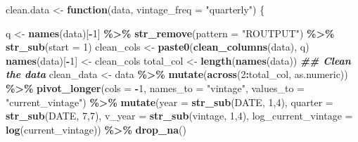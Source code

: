 \documentclass[
]{article}
\newenvironment{Shaded}{\begin{snugshade}}{\end{snugshade}}
\newcommand{\AttributeTok}[1]{\textcolor[rgb]{0.13,0.29,0.53}{#1}}
\newcommand{\ControlFlowTok}[1]{\textcolor[rgb]{0.13,0.29,0.53}{\textbf{#1}}}
\newcommand{\DecValTok}[1]{\textcolor[rgb]{0.00,0.00,0.81}{#1}}
\newcommand{\DocumentationTok}[1]{\textcolor[rgb]{0.56,0.35,0.01}{\textbf{\textit{#1}}}}
\newcommand{\FunctionTok}[1]{\textcolor[rgb]{0.13,0.29,0.53}{\textbf{#1}}}
\newcommand{\NormalTok}[1]{#1}
\newcommand{\OtherTok}[1]{\textcolor[rgb]{0.56,0.35,0.01}{#1}}
\newcommand{\SpecialCharTok}[1]{\textcolor[rgb]{0.81,0.36,0.00}{\textbf{#1}}}
\newcommand{\StringTok}[1]{\textcolor[rgb]{0.31,0.60,0.02}{#1}}
\begin{document}
\begin{Shaded}
\begin{Highlighting}[]
\NormalTok{clean.data }\OtherTok{\textless{}{-}} \ControlFlowTok{function}\NormalTok{(data, }\AttributeTok{vintage\_freq =} \StringTok{"quarterly"}\NormalTok{) \{}
    
\NormalTok{    q }\OtherTok{\textless{}{-}} \FunctionTok{names}\NormalTok{(data)[}\SpecialCharTok{{-}}\DecValTok{1}\NormalTok{] }\SpecialCharTok{\%\textgreater{}\%} \FunctionTok{str\_remove}\NormalTok{(}\AttributeTok{pattern =} \StringTok{"ROUTPUT"}\NormalTok{) }\SpecialCharTok{\%\textgreater{}\%} \FunctionTok{str\_sub}\NormalTok{(}\AttributeTok{start =} \DecValTok{1}\NormalTok{)}
\NormalTok{    clean\_cols }\OtherTok{\textless{}{-}} \FunctionTok{paste0}\NormalTok{(}\FunctionTok{clean\_columns}\NormalTok{(data), q)}
    \FunctionTok{names}\NormalTok{(data)[}\SpecialCharTok{{-}}\DecValTok{1}\NormalTok{] }\OtherTok{\textless{}{-}}\NormalTok{ clean\_cols}
\NormalTok{    total\_col }\OtherTok{\textless{}{-}} \FunctionTok{length}\NormalTok{(}\FunctionTok{names}\NormalTok{(data))}
    \DocumentationTok{\#\# Clean the data}
\NormalTok{    clean\_data }\OtherTok{\textless{}{-}}\NormalTok{ data }\SpecialCharTok{\%\textgreater{}\%}
      \FunctionTok{mutate}\NormalTok{(}\FunctionTok{across}\NormalTok{(}\DecValTok{2}\SpecialCharTok{:}\NormalTok{total\_col, as.numeric)) }\SpecialCharTok{\%\textgreater{}\%}
      \FunctionTok{pivot\_longer}\NormalTok{(}\AttributeTok{cols =} \SpecialCharTok{{-}}\DecValTok{1}\NormalTok{, }\AttributeTok{names\_to =} \StringTok{"vintage"}\NormalTok{, }\AttributeTok{values\_to =} \StringTok{"current\_vintage"}\NormalTok{) }\SpecialCharTok{\%\textgreater{}\%}
      \FunctionTok{mutate}\NormalTok{(}\AttributeTok{year =} \FunctionTok{str\_sub}\NormalTok{(DATE, }\DecValTok{1}\NormalTok{,}\DecValTok{4}\NormalTok{),}
             \AttributeTok{quarter =} \FunctionTok{str\_sub}\NormalTok{(DATE, }\DecValTok{7}\NormalTok{,}\DecValTok{7}\NormalTok{), }
             \AttributeTok{v\_year =} \FunctionTok{str\_sub}\NormalTok{(vintage, }\DecValTok{1}\NormalTok{,}\DecValTok{4}\NormalTok{),}
             \AttributeTok{log\_current\_vintage =} \FunctionTok{log}\NormalTok{(current\_vintage)) }\SpecialCharTok{\%\textgreater{}\%}
      \FunctionTok{drop\_na}\NormalTok{()}
    

\end{Highlighting}
\end{Shaded}
\end{document}
